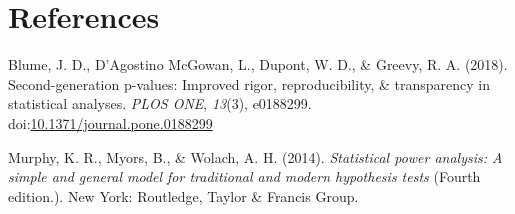\documentclass[man]{apa6}
\begin{document}
\newpage

\hypertarget{references}{%
\section{References}\label{references}}

\begingroup
\setlength{\parindent}{-0.5in}
\setlength{\leftskip}{0.5in}

\hypertarget{refs}{}
\leavevmode\hypertarget{ref-blume_second-generation_2018}{}%
Blume, J. D., D'Agostino McGowan, L., Dupont, W. D., \& Greevy, R. A. (2018). Second-generation p-values: Improved rigor, reproducibility, \& transparency in statistical analyses. \emph{PLOS ONE}, \emph{13}(3), e0188299. doi:\href{https://doi.org/10.1371/journal.pone.0188299}{10.1371/journal.pone.0188299}

\leavevmode\hypertarget{ref-murphy_statistical_2014}{}%
Murphy, K. R., Myors, B., \& Wolach, A. H. (2014). \emph{Statistical power analysis: A simple and general model for traditional and modern hypothesis tests} (Fourth edition.). New York: Routledge, Taylor \& Francis Group.

\endgroup
\end{document}

